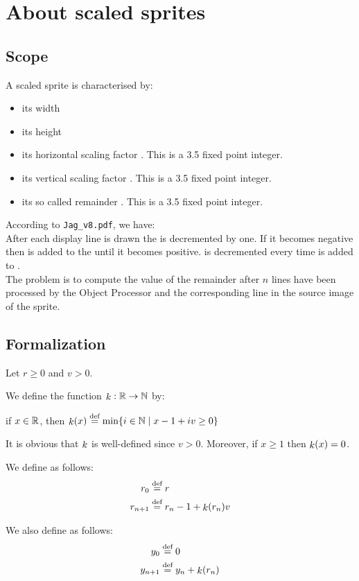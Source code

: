 \chapter{About scaled sprites}

\section{Scope}
A scaled sprite is characterised by:
\begin{itemize}
\item its width \wid{}
\item its height \hei{}
\item its horizontal scaling factor \hsc{}. This is a 3.5 fixed point
  integer.
\item its vertical scaling factor \vsc{}. This is a 3.5 fixed point
  integer.
\item its so called remainder \rem{}. This is a 3.5 fixed point
  integer.
\end{itemize}

According to \verb/Jag_v8.pdf/, we have:\\
{\small After each display line is drawn the \rem{} is
  decremented by one. If it becomes negative then \vsc{} is added to
  the \rem{} until it becomes positive. \hei{} is decremented every
  time \vsc{} is added to \rem{}.}\\

The problem is to compute the value of the remainder after $n$ lines
have been processed by the Object Processor and the corresponding line
in the source image of the sprite.

\section{Formalization}
Let $r \geq 0$ and $v > 0$.

We define the function $\mathop{k} : \mathbb{R} \to \mathbb{N}$ by:
\begin{center}
  if $x \in \mathbb{R}$, then $\mathop{k}(x) \stackrel{\text{def}}{=} \min \{ i \in \mathbb{N} \mid x - 1 + i v \geq 0 \}$
\end{center}
It is obvious that $\mathop{k}$ is well-defined since $v > 0$. Moreover, if $x \geq 1$ then $\mathop{k}(x) = 0$.

We define  as follows:
\begin{align*}
  r_0 & \stackrel{\text{def}}{=} r \\
  r_{n+1} & \stackrel{\text{def}}{=} r_n - 1 + \mathop{k}(r_n) v 
\end{align*}

We also define  as follows:
\begin{align*}
  y_0 & \stackrel{\text{def}}{=} 0 \\
  y_{n+1} & \stackrel{\text{def}}{=} y_n + \mathop{k}(r_n)
\end{align*}

